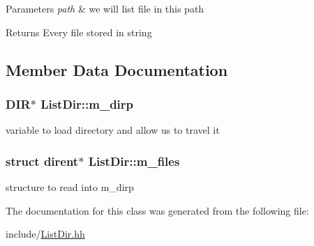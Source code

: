 \begin{DoxyParams}{Parameters}
{\em path} & we will list file in this path \\
\hline
\end{DoxyParams}
\begin{DoxyReturn}{Returns}
Every file stored in string 
\end{DoxyReturn}


\subsection{Member Data Documentation}
\hypertarget{class_list_dir_aaa998893571e65c0f82c129c52543148}{}
\subsubsection[{m\+\_\+dirp}]{\setlength{\rightskip}{0pt plus 5cm}D\+I\+R$\ast$ List\+Dir\+::m\+\_\+dirp\hspace{0.3cm}{\ttfamily [private]}}\label{class_list_dir_aaa998893571e65c0f82c129c52543148}
variable to \textquotesingle{}load\textquotesingle{} directory and allow us to travel it \hypertarget{class_list_dir_ad5c1cab9f4223840352773b289640d25}{}
\subsubsection[{m\+\_\+files}]{\setlength{\rightskip}{0pt plus 5cm}struct dirent$\ast$ List\+Dir\+::m\+\_\+files\hspace{0.3cm}{\ttfamily [private]}}\label{class_list_dir_ad5c1cab9f4223840352773b289640d25}
structure to read into m\+\_\+dirp 

The documentation for this class was generated from the following file\+:\begin{DoxyCompactItemize}
\item 
include/\hyperlink{_list_dir_8hh}{List\+Dir.\+hh}\end{DoxyCompactItemize}
